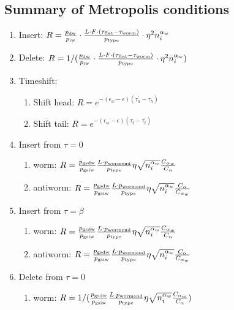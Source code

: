 \documentclass[12pt, two sided]{article}
\begin{document}
\subsection{Summary of Metropolis conditions}
	\begin{enumerate}
	\setcounter{enumi}{0}
		\item Insert: $R = \frac{p_{\rm{dw}}}{p_{\rm{iw}}} \cdot \frac{L \cdot F \cdot (\tau_{\rm{flat}}-\tau_{\rm{worm}})}{p_{\rm{type}}} \cdot \eta^2 n_i^{\alpha_w}$
		\item Delete: $R = 1/(\frac{p_{\rm{dw}}}{p_{\rm{iw}}} \cdot \frac{L \cdot F \cdot (\tau_{\rm{flat}}-\tau_{\rm{worm}})}{p_{\rm{type}}} \cdot \eta^2 n_i^{\alpha_w} )$
		\item Timeshift: 		
		\begin{enumerate}
		\item{Shift head: $R =  e^{-(\epsilon_w-\epsilon)(\tau_h^\prime-\tau_h)}$}
		\item{Shift tail: $R = e^{-(\epsilon_w-\epsilon)(\tau_t-\tau_t^\prime)}$}
		\end{enumerate}
		\item Insert from $\tau=0$
		\begin{enumerate}
		\item{worm: $R =  \frac{p_{\rm{gsdw}}}{p_{\rm{gsiw}}} \frac{L \cdot p_{\rm{wormend}}}{p_{\rm{type}}} \eta \sqrt{n_i^{\alpha_w}} \frac{C_{\alpha_w}}{C_{\alpha}} $ }
		\item{antiworm: $R =  \frac{p_{\rm{gsdw}}}{p_{\rm{gsiw}}} \frac{L \cdot p_{\rm{wormend}}}{p_{\rm{type}}} \eta \sqrt{n_i^{\alpha_w}} \frac{C_{\alpha}}{C_{\alpha_w}}$}
		\end{enumerate}
		\item Insert from $\tau=\beta$
		\begin{enumerate}
		\item{worm: $R =  \frac{p_{\rm{gsdw}}}{p_{\rm{gsiw}}} \frac{L \cdot p_{\rm{wormend}}}{p_{\rm{type}}}\eta \sqrt{n_i^{\alpha_w}} \frac{C_{\alpha_w}}{C_{\alpha}} $}
		\item{antiworm: $R =  \frac{p_{\rm{gsdw}}}{p_{\rm{gsiw}}} \frac{L \cdot p_{\rm{wormend}}}{p_{\rm{type}}} \eta \sqrt{n_i^{\alpha_w}} \frac{C_{\alpha}}{C_{\alpha_w}}$}
		\end{enumerate}
		\item Delete from $\tau=0$
		\begin{enumerate}
		\item{worm: $R =  1/(\frac{p_{\rm{gsdw}}}{p_{\rm{gsiw}}} \frac{L \cdot p_{\rm{wormend}}}{p_{\rm{type}}} \eta \sqrt{n_i^{\alpha_w}} \frac{C_{\alpha_w}}{C_{\alpha}} ) $ }

\end{enumerate}
\end{enumerate}
\end{document}
